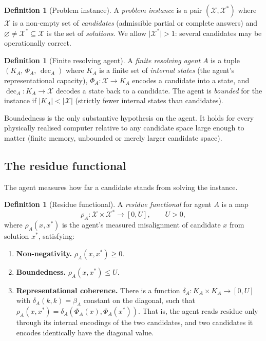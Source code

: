 \documentclass[twocolumn,10pt,a4paper]{article}
\theoremstyle{thmstyle}
\theoremstyle{definition}
\newtheorem{definition}[theorem]{Definition}
\theoremstyle{remark}
\newcommand{\floor}{\beta}
\newcommand{\res}{\rho}
\newcommand{\abs}[1]{\lvert#1\rvert}
\DeclareMathOperator{\dec}{dec}
\begin{document}
\begin{definition}[Problem instance]
\label{def:instance}
A \emph{problem instance} is a pair $(\mathcal{X}, \mathcal{X}^\ast)$
where $\mathcal{X}$ is a non-empty set of \emph{candidates} (admissible
partial or complete answers) and $\varnothing\neq\mathcal{X}^\ast
\subseteq\mathcal{X}$ is the set of \emph{solutions}. We allow
$\abs{\mathcal{X}^\ast}>1$: several candidates may be operationally
correct.
\end{definition}

\begin{definition}[Finite resolving agent]
\label{def:agent}
A \emph{finite resolving agent} $A$ is a tuple
$(K_A,\,\Phi_A,\,\dec_A)$ where $K_A$ is a finite set of
\emph{internal states} (the agent's representational capacity),
$\Phi_A\colon\mathcal{X}\to K_A$ encodes a candidate into a state, and
$\dec_A\colon K_A\to\mathcal{X}$ decodes a state back to a candidate. The
agent is \emph{bounded} for the instance if $\abs{K_A}<\abs{\mathcal{X}}$
(strictly fewer internal states than candidates).
\end{definition}

Boundedness is the only substantive hypothesis on the agent. It holds for
every physically realised computer relative to any candidate space large
enough to matter (finite memory, unbounded or merely larger candidate
space).

\subsection{The residue functional}

The agent measures how far a candidate stands from solving the instance.

\begin{definition}[Residue functional]
\label{def:residue}
A \emph{residue functional} for agent $A$ is a map
\[
\res_A\colon \mathcal{X}\times\mathcal{X}^\ast \to [0,U],
\qquad U>0,
\]
where $\res_A(x,x^\ast)$ is the agent's measured misalignment of
candidate $x$ from solution $x^\ast$, satisfying:
\begin{enumerate}[label=\textup{(R\arabic*)},leftmargin=2.8em,itemsep=2pt]
\item\label{R:nonneg} \textbf{Non-negativity.} $\res_A(x,x^\ast)\ge 0$.
\item\label{R:bound} \textbf{Boundedness.} $\res_A(x,x^\ast)\le U$.
\item\label{R:coherent} \textbf{Representational coherence.} There is a
function $\delta_A\colon K_A\times K_A\to[0,U]$ with $\delta_A(k,k)=\floor_A$
constant on the diagonal, such that
$\res_A(x,x^\ast)=\delta_A(\Phi_A(x),\Phi_A(x^\ast))$. That is, the agent
reads residue only through its internal encodings of the two candidates,
and two candidates it encodes identically have the diagonal value.
\end{enumerate}
\end{definition}
\end{document}
